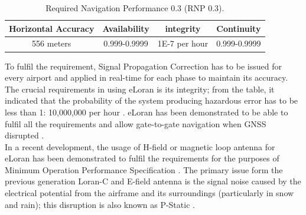 \begin{table}[h!]
\centering
\caption{Required Navigation Performance 0.3 (RNP 0.3).}
\begin{tabular}{||c c c c||} 
 \hline
Horizontal Accuracy & Availability & integrity & Continuity \\ [0.5ex] 
 \hline\hline
556 meters & 0.999-0.9999 & 1E-7 per hour & 0.999-0.9999 \\ [1ex]
 \hline
\end{tabular}
\label{table:1}
\end{table}

\noindent To fulfil the requirement, Signal Propagation Correction has to be issued for every airport and applied in real-time for each phase to maintain its accuracy. The crucial requirements in using eLoran is its integrity; from the table, it indicated that the probability of the system producing hazardous error has to be less than 1: 10,000,000 per hour \cite{InternationalLORANAssociation2007EnhancedApril}. eLoran has been demonstrated to be able to fulfil all the requirements and allow gate-to-gate navigation when GNSS disrupted \cite{InternationalLORANAssociation2007EnhancedApril}\cite{Narins2014TheBoard}.\\

\noindent In a recent development, the usage of H-field or magnetic loop antenna for eLoran has been demonstrated to fulfil the requirements for the purposes of Minimum Operation Performance Specification \cite{Anonymous2016ELoranLight}. The primary issue form the previous generation Loran-C and E-field antenna is the signal noise caused by the electrical potential from the airframe and its surroundings (particularly in snow and rain); this disruption is also known as P-Static \cite{BartoneH-fieldApplications}.\\

